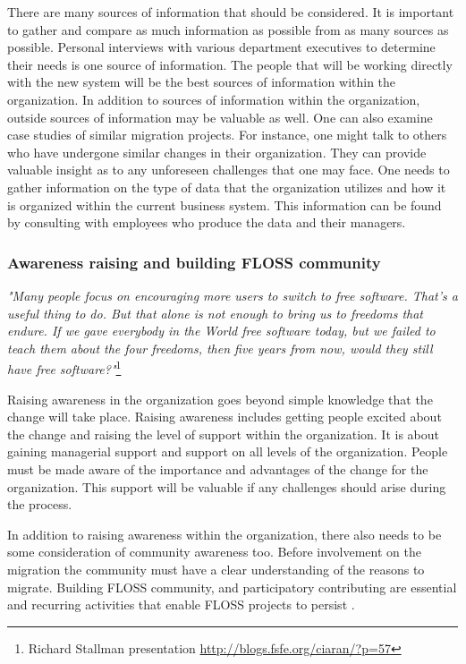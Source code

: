     There are many sources of information that should be considered. It is important to gather and compare as much information as possible from as many sources as possible. Personal interviews with various department executives to determine their needs is one source of information. The people that will be working directly with the new system will be the best sources of information within the organization.  In addition to sources of information within the organization, outside sources of information may be valuable as well. One can also examine case studies of similar migration projects. For instance, one might talk to others who have undergone similar changes in their organization. They can provide valuable insight as to any unforeseen challenges that one may face. One needs to gather information on the type of data that the organization utilizes and how it is organized within the current business system.  This information can be found by consulting with employees who produce the data and their managers.
    
    \subsubsection{Awareness raising and building FLOSS community}
    
    \textit{ "Many people focus on encouraging more users to switch to free software. That's a useful thing to do. But that alone is not enough to bring us to freedoms that endure. If we gave everybody in the World free software today, but we failed to teach them about the four freedoms, then five years from now, would they still have free software?"}\footnote{Richard Stallman  presentation \url{http://blogs.fsfe.org/ciaran/?p=57}}
    
    Raising awareness in the organization goes beyond simple knowledge that the change will take place. Raising awareness includes getting people excited about the change and raising the level of support within the organization. It is about gaining managerial support and support on all levels of the organization. People must be made aware of the importance and advantages of the change for the organization. This support will be valuable if any challenges should arise during the process. 
    
    In addition to raising awareness within the organization, there also needs to be some consideration of community awareness too. Before involvement on the migration the community must have a clear understanding of the reasons to migrate.
    Building FLOSS community, and participatory contributing are essential and recurring activities that enable FLOSS projects to persist .

